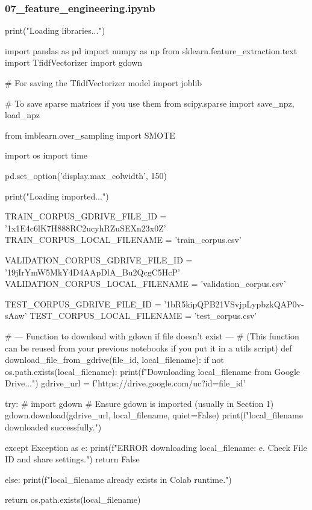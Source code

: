 \subsubsection*{07\_feature\_engineering.ipynb}

\begin{ffcode}
print("Loading libraries...")

import pandas as pd
import numpy as np
from sklearn.feature_extraction.text import TfidfVectorizer
import gdown

# For saving the TfidfVectorizer model
import joblib

# To save sparse matrices if you use them
from scipy.sparse import save_npz, load_npz

from imblearn.over_sampling import SMOTE

import os
import time

pd.set_option('display.max_colwidth', 150)

print("Loading imported...")

TRAIN_CORPUS_GDRIVE_FILE_ID = '1x1E4c6lK7H888RC2ucyhRZuSEXn23x0Z'
TRAIN_CORPUS_LOCAL_FILENAME = 'train_corpus.csv'

VALIDATION_CORPUS_GDRIVE_FILE_ID = '19jIrYmW5MkY4D4AApDlA_Bu2QcgC5HcP'
VALIDATION_CORPUS_LOCAL_FILENAME = 'validation_corpus.csv'

TEST_CORPUS_GDRIVE_FILE_ID = '1bR5kipQPB21VSvjpLypbzkQAP0v-sAaw'
TEST_CORPUS_LOCAL_FILENAME = 'test_corpus.csv'

# --- Function to download with gdown if file doesn't exist ---
# (This function can be reused from your previous notebooks if you put it in a utils script)
def download_file_from_gdrive(file_id, local_filename):
    if not os.path.exists(local_filename):
        print(f"Downloading {local_filename} from Google Drive...")
        gdrive_url = f'https://drive.google.com/uc?id={file_id}'

        try:
            # import gdown # Ensure gdown is imported (usually in Section 1)
            gdown.download(gdrive_url, local_filename, quiet=False)
            print(f"{local_filename} downloaded successfully.")

        except Exception as e:
            print(f"ERROR downloading {local_filename}: {e}. Check File ID and share settings.")
            return False

    else:
        print(f"{local_filename} already exists in Colab runtime.")

    return os.path.exists(local_filename)


\end{ffcode}
